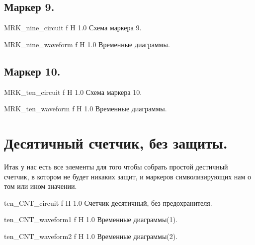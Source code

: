 \documentclass{bmstu}
\begin{document}
	\subsection{Маркер 9.}	
	
	{MRK_nine_circuit}
	{f} %
	{H} %
	{1.0\textwidth} %
	{Схема маркера 9.} %
	
	{MRK_nine_waveform}
	{f} %
	{H} %
	{1.0\textwidth} %
	{Временные диаграммы.} %
	
	\subsection{Маркер 10.}

	{MRK_ten_circuit}
	{f} %
	{H} %
	{1.0\textwidth} %
	{Схема маркера 10.} %
	
	{MRK_ten_waveform}
	{f} %
	{H} %
	{1.0\textwidth} %
	{Временные диаграммы.} %

	\section{Десятичный счетчик, без защиты.}

	\begin{flushleft}
		Итак у нас есть все элементы для того чтобы собрать простой дестичный счетчик, 
		в котором не будет никаких защит, и маркеров символизирующих нам о том или ином значении.
	\end{flushleft}

	{ten_CNT_circuit}
	{f} %
	{H} %
	{1.0\textwidth} %
	{Счетчик десятичный, без предохранителя.} %
	
	{ten_CNT_waveform1}
	{f} %
	{H} %
	{1.0\textwidth} %
	{Временные диаграммы(1).} %
	
	{ten_CNT_waveform2}
	{f} %
	{H} %
	{1.0\textwidth} %
	{Временные диаграммы(2).} %
\end{document}
